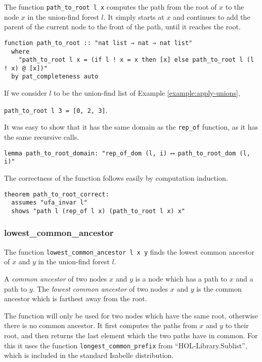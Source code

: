 The function \lstinline{path_to_root l x} computes the path from the root of $x$ to the node $x$ in the union-find forest $l$. It simply starts at $x$ and continues to add the parent of the current node to the front of the path, until it reaches the root.

\begin{lstlisting}
function path_to_root :: "nat list ⇒ nat ⇒ nat list"
  where
    "path_to_root l x = (if l ! x = x then [x] else path_to_root l (l ! x) @ [x])"
  by pat_completeness auto
\end{lstlisting}

\begin{exmp}
If we consider $l$ to be the union-find list of Example \ref{example:apply-unions},

\lstinline|path_to_root l 3 = [0, 2, 3]|.
\end{exmp}

It was easy to show that it has the same domain as the \lstinline{rep_of} function, as it has the same recursive calls.

\begin{lstlisting}
lemma path_to_root_domain: "rep_of_dom (l, i) ⟷ path_to_root_dom (l, i)"
\end{lstlisting}

The correctness of the function follows easily by computation induction.

\begin{lstlisting}
theorem path_to_root_correct:
  assumes "ufa_invar l"
  shows "path l (rep_of l x) (path_to_root l x) x"
\end{lstlisting}

\subsubsection{lowest\_common\_ancestor}

The function \lstinline{lowest_common_ancestor l x y} finds the lowest common ancestor of $x$ and $y$ in the union-find forest $l$.

\begin{definition}
A \emph{common ancestor} of two nodes $x$ and $y$ is a node which has a path to $x$ and a path to $y$.
The \emph{lowest common ancestor} of two nodes $x$ and $y$ is the common ancestor which is farthest away from the root.
\end{definition}

The function will only be used for two nodes which have the same root, otherwise there is no common ancestor. It first computes the paths from $x$ and $y$ to their root, and then returns the last element which the two paths have in common. For this it uses the function \lstinline{longest_common_prefix} from ``HOL-Library.Sublist'', which is included in the standard Isabelle distribution.

